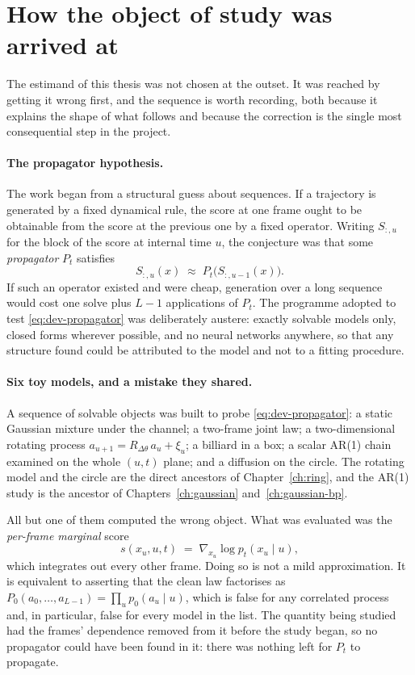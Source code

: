 \section{How the object of study was arrived at}\label{sec:dev-history}

The estimand of this thesis was not chosen at the outset. It was reached by
getting it wrong first, and the sequence is worth recording, both because it
explains the shape of what follows and because the correction is the single
most consequential step in the project.

\paragraph{The propagator hypothesis.} The work began from a structural guess
about sequences. If a trajectory is generated by a fixed dynamical rule, the score at one frame
ought to be obtainable from the score at the previous one by a fixed operator.
Writing $S_{:,u}$ for the block of the score at internal time $u$, the
conjecture was that some \emph{propagator} $P_t$ satisfies
\begin{equation}
  S_{:,u}(x) \;\approx\; P_t\big(S_{:,u-1}(x)\big).
  \label{eq:dev-propagator}
\end{equation}
If such an operator existed and were cheap, generation over a long sequence
would cost one solve plus $L-1$ applications of $P_t$. The programme adopted to
test \eqref{eq:dev-propagator} was deliberately austere: exactly solvable
models only, closed forms wherever possible, and no neural networks anywhere,
so that any structure found could be attributed to the model and not to a
fitting procedure.

\paragraph{Six toy models, and a mistake they shared.} A sequence of solvable
objects was built to probe \eqref{eq:dev-propagator}: a static Gaussian
mixture under the channel; a two-frame joint law; a two-dimensional rotating
process $a_{u+1} = R_{\Delta\theta}\, a_u + \xi_u$; a billiard in a box; a
scalar AR(1) chain examined on the whole $(u,t)$ plane; and a diffusion on the
circle. The rotating model and the circle are the direct ancestors of
Chapter~\ref{ch:ring}, and the AR(1) study is the ancestor of
Chapters~\ref{ch:gaussian} and~\ref{ch:gaussian-bp}.

All but one of them computed the wrong object. What was evaluated was the
\emph{per-frame marginal} score
\begin{equation}
  s(x_u, u, t) \;=\; \nabla_{x_u} \log p_t(x_u \mid u),
  \label{eq:dev-marginal-score}
\end{equation}
which integrates out every other frame. Doing so is not a mild approximation.
It is equivalent to asserting that the clean law factorises as
$P_0(a_0,\dots,a_{L-1}) = \prod_u p_0(a_u \mid u)$, which is false for any
correlated process and, in particular, false for every model in the list.
The quantity being studied had the frames' dependence removed from it before
the study began, so no propagator could have been found in it: there was
nothing left for $P_t$ to propagate.

